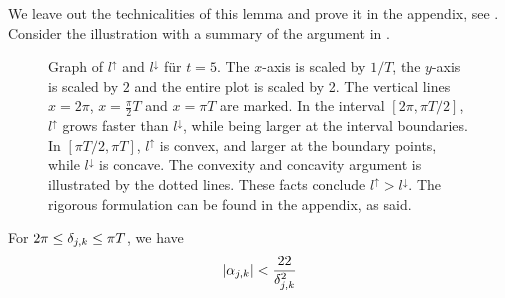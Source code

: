 We leave out the technicalities of this lemma and prove it in the appendix, see . Consider the illustration with a summary of the argument in .

\begin{figure}[!hbtp]
    \centering
    \caption{Graph of \(l^\uparrow\) and \(l^\downarrow\) für \(t = 5\). The \(x\)-axis is scaled by \(1/T\), the \(y\)-axis is scaled by \(2\) and the entire plot is scaled by 2. The vertical lines \(x = 2\pi\), \(x = \frac{\pi}{2} T\) and \(x = \pi T\) are marked. In the interval \([2\pi, \pi T/2]\), \(l^\uparrow\) grows faster than \(l^\downarrow\), while being larger at the interval boundaries. In \([\pi T / 2, \pi T]\), \(l^\uparrow\) is convex, and larger at the boundary points, while \(l^\downarrow\) is concave. The convexity and concavity argument is illustrated by the dotted lines. These facts conclude \(l^\uparrow > l^\downarrow\). The rigorous formulation can be found in the appendix, as said.}
    \label{sine_comp_lemma_visualized}
\end{figure}

\begin{lemma} \label{alpha_delta_values_relation}
    For \(2\pi \leq \delta_{j, k} \leq \pi T\), we have
    \begin{align}
        |\alpha_{j, k}| < \frac{22}{\delta_{j, k}^2}
    \end{align}
\end{lemma}

